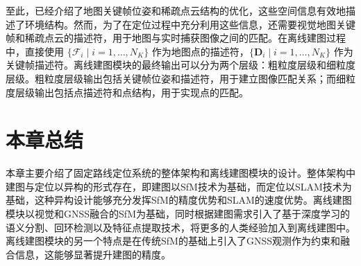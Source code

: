 至此，已经介绍了地图关键帧位姿和稀疏点云结构的优化，这些空间信息有效地描述了环境结构。然而，为了在定位过程中充分利用这些信息，还需要视觉地图关键帧和稀疏点云的描述符，用于地图与实时捕获图像之间的匹配。在离线建图过程中，直接使用 $\{\mathcal{F}_i \mid i = 1, \ldots, N_K\}$ 作为地图点的描述符，$\{\mathbf{D}_i \mid i = 1, \ldots, N_K\}$ 作为关键帧描述符。离线建图模块的最终输出可以分为两个层级：粗粒度层级和细粒度层级。粗粒度层级输出包括关键帧位姿和描述符，用于建立图像匹配关系；而细粒度层级输出包括点描述符和点结构，用于实现点的匹配。

\section{本章总结}
本章主要介绍了固定路线定位系统的整体架构和离线建图模块的设计。整体架构中建图与定位以异构的形式存在，即建图以SfM技术为基础，而定位以SLAM技术为基础，这种异构设计能够充分发挥SfM的精度优势和SLAM的速度优势。离线建图模块以视觉和GNSS融合的SfM为基础，同时根据建图需求引入了基于深度学习的语义分割、回环检测以及特征点提取技术，将更多的人类经验加入到离线建图中。离线建图模块的另一个特点是在传统SfM的基础上引入了GNSS观测作为约束和融合信息，这能够显著提升建图的精度。
